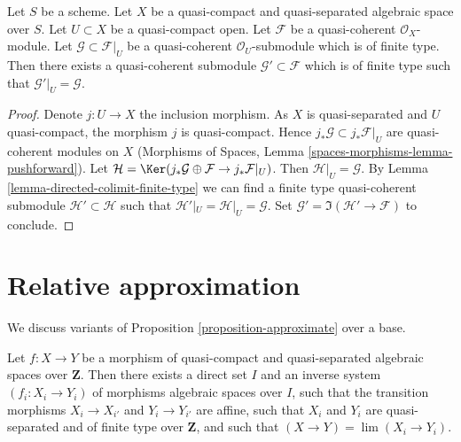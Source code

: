 \begin{lemma}
\label{lemma-extend}
Let $S$ be a scheme.
Let $X$ be a quasi-compact and quasi-separated algebraic space over $S$.
Let $U \subset X$ be a quasi-compact open.
Let $\mathcal{F}$ be a quasi-coherent $\mathcal{O}_X$-module.
Let $\mathcal{G} \subset \mathcal{F}|_U$ be a quasi-coherent
$\mathcal{O}_U$-submodule which is of finite type. Then
there exists a quasi-coherent submodule $\mathcal{G}' \subset \mathcal{F}$
which is of finite type such that $\mathcal{G}'|_U = \mathcal{G}$.
\end{lemma}

\begin{proof}
Denote $j : U \to X$ the inclusion morphism. As $X$ is quasi-separated
and $U$ quasi-compact, the morphism $j$ is quasi-compact. Hence
$j_*\mathcal{G} \subset j_*\mathcal{F}|_U$ are quasi-coherent modules
on $X$ (Morphisms of Spaces, Lemma
\ref{spaces-morphisms-lemma-pushforward}).
Let $\mathcal{H} =
\Ker(j_*\mathcal{G} \oplus \mathcal{F} \to j_*\mathcal{F}|_U)$.
Then $\mathcal{H}|_U = \mathcal{G}$. By
Lemma \ref{lemma-directed-colimit-finite-type}
we can find a finite type quasi-coherent submodule
$\mathcal{H}' \subset \mathcal{H}$ such that
$\mathcal{H}'|_U = \mathcal{H}|_U = \mathcal{G}$.
Set $\mathcal{G}' = \Im(\mathcal{H}' \to \mathcal{F})$
to conclude.
\end{proof}









\section{Relative approximation}
\label{section-relative-approximation}

\noindent
We discuss variants of Proposition \ref{proposition-approximate}
over a base.

\begin{lemma}
\label{lemma-approximate-morphism}
Let $f : X \to Y$ be a morphism of quasi-compact and quasi-separated
algebraic spaces over $\mathbf{Z}$.
Then there exists a direct set $I$ and an inverse system $(f_i : X_i \to Y_i)$
of morphisms algebraic spaces over $I$, such that the transition morphisms
$X_i \to X_{i'}$ and $Y_i \to Y_{i'}$ are affine, such that $X_i$
and $Y_i$ are quasi-separated and of finite type over $\mathbf{Z}$, and
such that $(X \to Y) = \lim (X_i \to Y_i)$.
\end{lemma}

